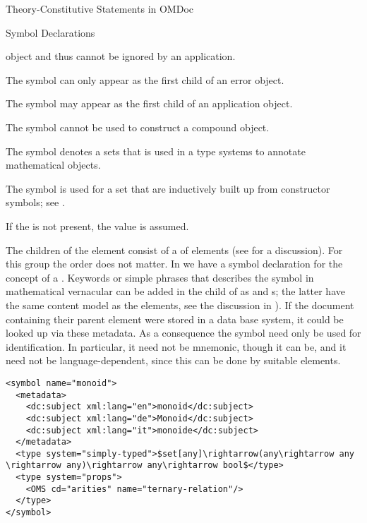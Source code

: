 \begin{omgroup}[short=Mathematical Statements,id=statements]
\begin{omgroup}[id=constitutive-statements]{Theory-Constitutive Statements in OMDoc}
\begin{module}[id=constitutive-statements]
\begin{omgroup}[id=symbol-dec]{Symbol Declarations}
\begin{definition}[id=symbol.def]
\begin{description}
  {\openmath} object and thus cannot be ignored by an application.
\item[\attval{error}{role}{symbol}] The symbol can only appear as the first child of an
  {\openmath} error object.
\item[\attval{application}{role}{symbol}] The symbol may appear as the first child of an
  application object.
\item[\attval{constant}{role}{symbol}] The symbol cannot be used to construct a compound
  object.
\item[\attval{type}{role}{symbol}] The symbol denotes a sets that is used in a type
  systems to annotate mathematical objects.
\item[\attval{sort}{role}{symbol}] The symbol is used for a set that are inductively
  built up from constructor symbols; see .
\end{description}
If the  is not present, the value
 is assumed.

The children of the  element consist of a
{} of  elements (see  for
a discussion). For this group the order does not matter.  In {} we have a
symbol declaration for the concept of a {}.  Keywords or simple phrases
that describes the symbol in mathematical vernacular can be added in the
 child of  as  and
{s}; the latter have the same content model as the
 elements, see the discussion in ). If the document
containing their parent  element were stored in a data base system, it
could be looked up via these metadata. As a consequence the symbol
 need only be used for identification. In particular, it need
not be mnemonic, though it can be, and it need not be language-dependent, since this can
be done by suitable  elements.
\end{definition}

\begin{lstlisting}[label=lst:symbol,mathescape,
  caption={An \omdoc \element{symbol} Declaration},
  index={symbol,type}]
<symbol name="monoid">
  <metadata>
    <dc:subject xml:lang="en">monoid</dc:subject>
    <dc:subject xml:lang="de">Monoid</dc:subject>
    <dc:subject xml:lang="it">monoide</dc:subject>
  </metadata>
  <type system="simply-typed">$set[any]\rightarrow(any\rightarrow any \rightarrow any)\rightarrow any\rightarrow bool$</type>
  <type system="props">
    <OMS cd="arities" name="ternary-relation"/>
  </type>
</symbol>
\end{lstlisting}
\end{omgroup}


\end{module}
\end{omgroup}
\end{omgroup}
